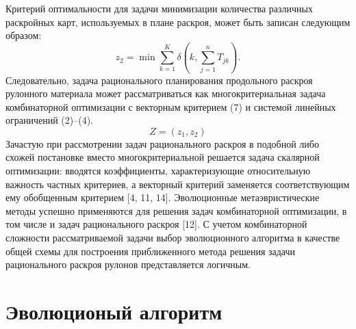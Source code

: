 \documentclass[12pt]{article}
\begin{document}
Критерий оптимальности для задачи минимизации количества различных раскройных 
карт, используемых в плане раскроя, может быть записан следующим образом:
\begin{equation}
    z_2=\min{\sum_{k=1}^{K}} \delta\left(k, \sum_{j=1}^{n} T_{jk}\right).
\end{equation}
Следовательно, задача рационального планирования продольного раскроя рулонного 
материала может рассматриваться как многокритериальная задача комбинаторной 
оптимизации с векторным критерием (7) и системой линейных ограничений (2)--(4).
\begin{equation}
    Z=(z_1,z_2)
\end{equation}
Зачастую при рассмотрении задач рационального раскроя в подобной либо схожей 
постановке вместо многокритериальной решается задача скалярной оптимизации: 
вводятся коэффициенты, характеризующие относительную важность частных 
критериев, а векторный критерий заменяется соответствующим ему обобщенным 
критерием [4, 11, 14]. Эволюционные метаэвристические методы успешно 
применяются для решения задач комбинаторной оптимизации, в том числе и задач 
рационального раскроя [12]. С учетом комбинаторной сложности рассматриваемой 
задачи выбор эволюционного алгоритма в качестве общей схемы для построения 
приближенного метода решения задачи рационального раскроя рулонов 
представляется логичным.


\section{Эволюционый алгоритм}
\end{document}
